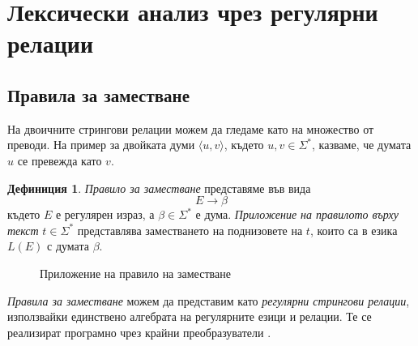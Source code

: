 \documentclass[12pt, oneside]{article}
\theoremstyle{definition}
\newtheorem{definition}{Дефиниция}[section]
\begin{document}
\pagebreak
\section{Лексически анализ чрез регулярни релации}

\subsection{Правила за заместване}

На двоичните стрингови релации можем да гледаме като на множество от преводи. На пример за двойката думи \( \langle u, v \rangle \), където \(u,v \in \Sigma^*\), казваме, че думата \( u \) се превежда като \( v \).

\begin{definition}
	\emph{Правило за заместване} представяме във вида
	\[ E \to \beta \]
	където \( E \) е регулярен израз, а \( \beta \in \Sigma^* \) е дума.
	\emph{Приложение на правилото върху текст} \( t \in \Sigma^* \) представлява заместването на поднизовете на \( t \), които са в езика \( L(E) \) с думата \( \beta \).
\end{definition}

\begin{figure}[!htb]
	\centering
	\caption{Приложение на правило на заместване}
\end{figure}

\noindent \emph{Правила за заместване} можем да представим като \emph{регулярни стрингови релации}, използвайки единствено алгебрата на регулярните езици и релации. Те се реализират програмно чрез крайни преобразуватели \cite{Kaplan&Kay:94}.
\end{document}
